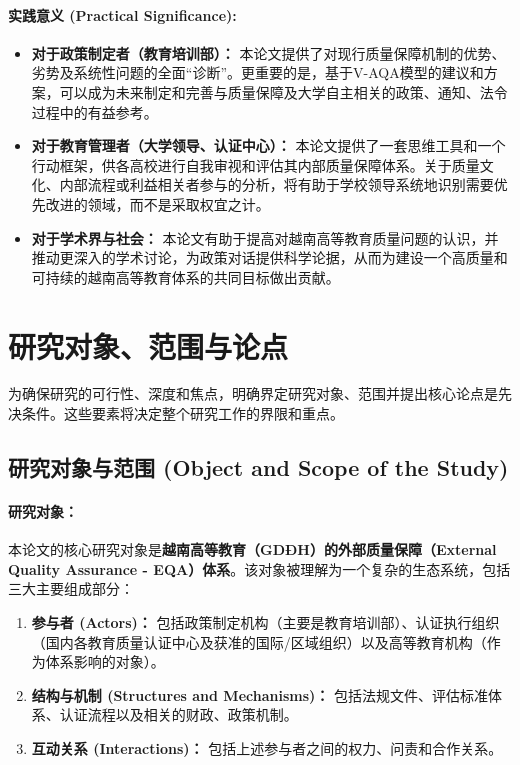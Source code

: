 \paragraph{实践意义 (Practical Significance):}
\begin{itemize}
    \item \textbf{对于政策制定者（教育培训部）：} 本论文提供了对现行质量保障机制的优势、劣势及系统性问题的全面“诊断”。更重要的是，基于V-AQA模型的建议和方案，可以成为未来制定和完善与质量保障及大学自主相关的政策、通知、法令过程中的有益参考。
    \item \textbf{对于教育管理者（大学领导、认证中心）：} 本论文提供了一套思维工具和一个行动框架，供各高校进行自我审视和评估其内部质量保障体系。关于质量文化、内部流程或利益相关者参与的分析，将有助于学校领导系统地识别需要优先改进的领域，而不是采取权宜之计。
    \item \textbf{对于学术界与社会：} 本论文有助于提高对越南高等教育质量问题的认识，并推动更深入的学术讨论，为政策对话提供科学论据，从而为建设一个高质量和可持续的越南高等教育体系的共同目标做出贡献。
\end{itemize}




\section{研究对象、范围与论点}
\label{sec:doi_tuong_pham_vi_luandiem}

为确保研究的可行性、深度和焦点，明确界定研究对象、范围并提出核心论点是先决条件。这些要素将决定整个研究工作的界限和重点。

\subsection{研究对象与范围 (Object and Scope of the Study)}
\label{subsec:doi_tuong_pham_vi}

\paragraph{研究对象：}
本论文的核心研究对象是\textbf{越南高等教育（GDĐH）的外部质量保障（External Quality Assurance - EQA）体系}。该对象被理解为一个复杂的生态系统，包括三大主要组成部分：
\begin{enumerate}
    \item \textbf{参与者 (Actors)：} 包括政策制定机构（主要是教育培训部）、认证执行组织（国内各教育质量认证中心及获准的国际/区域组织）以及高等教育机构（作为体系影响的对象）。
    \item \textbf{结构与机制 (Structures and Mechanisms)：} 包括法规文件、评估标准体系、认证流程以及相关的财政、政策机制。
    \item \textbf{互动关系 (Interactions)：} 包括上述参与者之间的权力、问责和合作关系。
\end{enumerate}

